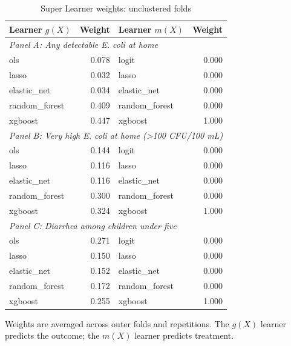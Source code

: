 \begin{table}[htbp]
\centering
\caption{Super Learner weights: unclustered folds}
\label{tab:super-learner-weights-unclustered}
\small
\begin{tabular}{lrlr}
\toprule
Learner $g(X)$ & Weight & Learner $m(X)$ & Weight \\
\midrule
\multicolumn{4}{l}{\textit{Panel A: Any detectable E. coli at home}} \\
ols & 0.078 & logit & 0.000 \\
lasso & 0.032 & lasso & 0.000 \\
elastic\_net & 0.034 & elastic\_net & 0.000 \\
random\_forest & 0.409 & random\_forest & 0.000 \\
xgboost & 0.447 & xgboost & 1.000 \\
\midrule
\multicolumn{4}{l}{\textit{Panel B: Very high E. coli at home (>100 CFU/100 mL)}} \\
ols & 0.144 & logit & 0.000 \\
lasso & 0.116 & lasso & 0.000 \\
elastic\_net & 0.116 & elastic\_net & 0.000 \\
random\_forest & 0.300 & random\_forest & 0.000 \\
xgboost & 0.324 & xgboost & 1.000 \\
\midrule
\multicolumn{4}{l}{\textit{Panel C: Diarrhea among children under five}} \\
ols & 0.271 & logit & 0.000 \\
lasso & 0.150 & lasso & 0.000 \\
elastic\_net & 0.152 & elastic\_net & 0.000 \\
random\_forest & 0.172 & random\_forest & 0.000 \\
xgboost & 0.255 & xgboost & 1.000 \\
\bottomrule
\end{tabular}
\par\vspace{3pt}
\begin{minipage}{0.9\linewidth}\footnotesize Weights are averaged across outer folds and repetitions. The $g(X)$ learner predicts the outcome; the $m(X)$ learner predicts treatment.\end{minipage}
\end{table}